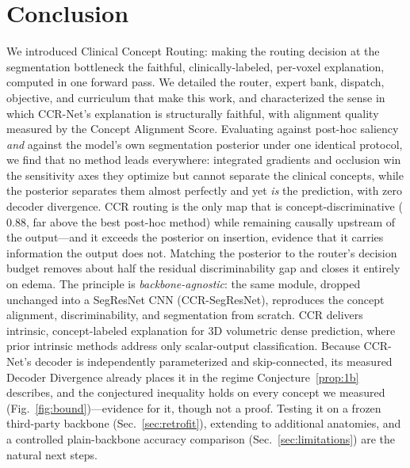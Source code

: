 \documentclass[runningheads]{llncs}
\begin{document}
\section{Conclusion}
We introduced Clinical Concept Routing: making the routing decision at the segmentation
bottleneck the faithful, clinically-labeled, per-voxel explanation, computed in one forward
pass. We detailed the router, expert bank, dispatch, objective, and curriculum that make
this work, and characterized the sense in which CCR-Net's explanation is structurally faithful,
with alignment quality measured by the Concept Alignment Score. Evaluating against post-hoc
saliency \emph{and} against the model's own segmentation posterior under one identical protocol,
we find that no method leads everywhere: integrated gradients and occlusion win the sensitivity
axes they optimize but cannot separate the clinical concepts, while the posterior separates them
almost perfectly and yet \emph{is} the prediction, with zero decoder divergence. CCR routing is
the only map that is concept-discriminative ($0.88$, far above the best post-hoc method) while
remaining causally upstream of the output---and it exceeds the posterior on insertion, evidence
that it carries information the output does not. Matching the posterior to the router's decision
budget removes about half the residual discriminability gap and closes it entirely on edema. The
principle is \emph{backbone-agnostic}: the same module, dropped unchanged into a SegResNet CNN
(CCR-SegResNet), reproduces the concept alignment, discriminability, and segmentation from
scratch. CCR delivers intrinsic, concept-labeled explanation for 3D volumetric dense prediction,
where prior intrinsic methods address only scalar-output classification. Because CCR-Net's decoder is independently
parameterized and skip-connected, its measured Decoder Divergence already places it in the
regime Conjecture~\ref{prop:1b} describes, and the conjectured inequality holds on every concept
we measured (Fig.~\ref{fig:bound})---evidence for it, though not a proof. Testing it on a frozen
third-party backbone (Sec.~\ref{sec:retrofit}), extending to additional anatomies, and a
controlled plain-backbone accuracy comparison (Sec.~\ref{sec:limitations}) are the natural next
steps.



\end{document}
